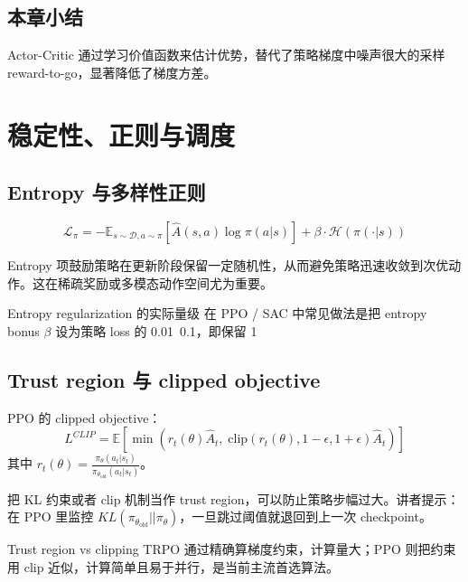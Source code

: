 \documentclass[a4paper]{article}
\begin{document}
\subsection{本章小结}

Actor-Critic 通过学习价值函数来估计优势，替代了策略梯度中噪声很大的采样 reward-to-go，显著降低了梯度方差。

\section{稳定性、正则与调度}

\subsection{Entropy 与多样性正则}

\begin{equation*}
\mathcal{L}_\pi = -\mathbb{E}_{s \sim \mathcal{D}, a \sim \pi} \left[\hat{A}(s,a)\log \pi(a|s)\right] + \beta \cdot \mathcal{H}(\pi(\cdot|s))
\end{equation*}

Entropy 项鼓励策略在更新阶段保留一定随机性，从而避免策略迅速收敛到次优动作。这在稀疏奖励或多模态动作空间尤为重要。

\begin{importantbox}{Entropy regularization 的实际量级}
在 PPO / SAC 中常见做法是把 entropy bonus $\beta$ 设为策略 loss 的 0.01~0.1，即保留 1%
\end{importantbox}

\subsection{Trust region 与 clipped objective}

PPO 的 clipped objective：
$${L}^{CLIP} = \mathbb{E} \left[ \min\left( r_t(\theta)\hat{A}_t, \; \text{clip}(r_t(\theta), 1-\epsilon, 1+\epsilon)\hat{A}_t \right) \right]$$
其中 $r_t(\theta) = \frac{\pi_\theta(a_t|s_t)}{\pi_{\theta_{\text{old}}}(a_t|s_t)}$。

把 KL 约束或者 clip 机制当作 trust region，可以防止策略步幅过大。讲者提示：在 PPO 里监控 $KL(\pi_{\theta_{\text{old}}}||\pi_\theta)$，一旦跳过阈值就退回到上一次 checkpoint。

\begin{knowledgebox}{Trust region vs clipping}
TRPO 通过精确算梯度约束，计算量大；PPO 则把约束用 clip 近似，计算简单且易于并行，是当前主流首选算法。
\end{knowledgebox}
\end{document}
